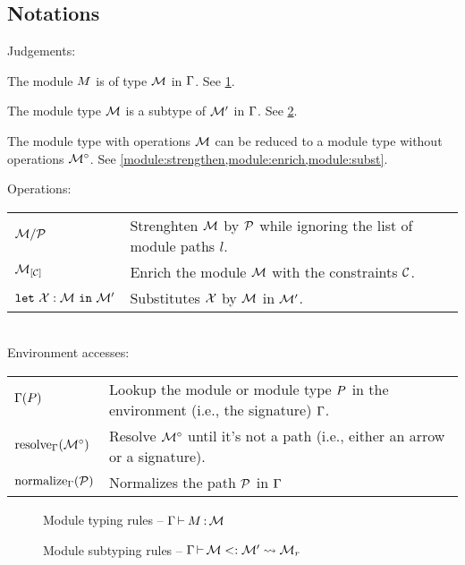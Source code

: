 \subsection{Notations}

Judgements:\\
\begin{description}[align=right, leftmargin=3.5cm]
\item[$\wtm{\E}{\im}{\iM}$ :]
  The module $M$ is of type $\mathcal M$ in $\Gamma$.
  See \cref{module:typing}.
\item[$\submod{\E}{\iM}{\iM'}{\iM_r}$ :]
  The module type $\mathcal M$ is a subtype of $\mathcal M'$ in $\Gamma$.
  See \cref{module:subtyping}.
\item[$\Oreduce{\E}{\iM} = \iMO$ :]
  The module type with operations $\mathcal M$ can be reduced to a module
  type without operations ${\mathcal M^\circ}$.
  See \cref{module:strengthen,module:enrich,module:subst}.
\end{description}

Operations:\\
\begin{tabular}{ll}
  $\mathcal M/\mathcal P$
  & Strenghten $\mathcal M$ by $\mathcal P$ while ignoring the list of module paths $l$.\\
  ${\mathcal M}_{\left[\mathcal C\right]}$
  & Enrich the module $\mathcal M$ with the constraints $\mathcal C$.\\
  $\mathtt{let}\ \mathcal X : \mathcal M\ \mathtt{in}\ \mathcal M'$
  & Substitutes $\mathcal X$ by $\mathcal M$ in $\mathcal M'$.
\end{tabular}\\

Environment accesses:\\
\begin{tabular}{ll}
  $\Gamma(P)$
  & Lookup the module or module type $P$ in the environment (i.e., the signature)
    $\Gamma$.\\
  $\operatorname{resolve}_{\Gamma}({\mathcal M^\circ})$
  & Resolve ${\mathcal M^\circ}$ until it's not a path (i.e., either an arrow or a signature).\\
  $\operatorname{normalize}_{\Gamma}(\mathcal P)$
  & Normalizes the path $\mathcal P$ in $\Gamma$
\end{tabular}

\begin{figure}[tbp]
  \vspace{-3mm}
  \caption{Module typing rules -- $\wtm{\E}{\im}{\iM}$}
  \label{module:typing}
\end{figure}

\begin{figure}[tbp]
  \vspace{-3mm}
  \caption{Module subtyping rules -- $\submod{\E}{\iM}{\iM'}{\iM_r}$}
  \label{module:subtyping}
\end{figure}

